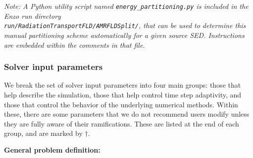 \documentclass[10pt]{article}
\renewcommand{\(}{\left(}
\renewcommand{\)}{\right)}
\begin{document}
{\em Note: A Python utility script named {\tt energy\_partitioning.py}
is included in the Enzo run directory \\
{\tt run/RadiationTransportFLD/AMRFLDSplit/}, that can be used to
determine this manual partitioning scheme automatically for a given 
source SED.  Instructions are embedded within the comments in that
file.}


\subsubsection{Solver input parameters}
\label{sec:solver_input_parameters}


We break the set of solver input parameters into four main groups:
those that help describe the simulation, those that help control time
step adaptivity, and those that control the behavior of the underlying
numerical methods.  Within these, there are some parameters that we do
not recommend users modify unless they are fully aware of their
ramifications.  These are listed at the end of each group, and are
marked by $\dagger$.


{\bf General problem definition:}
\end{document}
